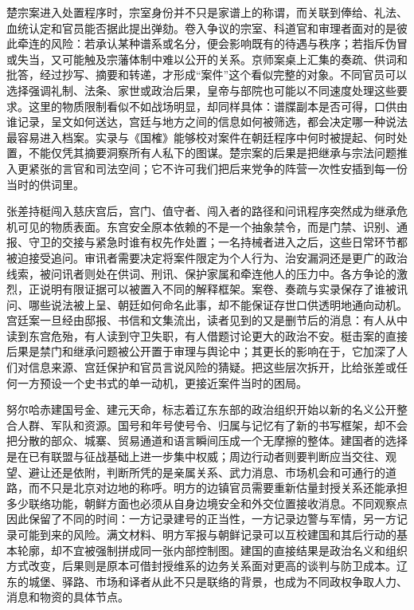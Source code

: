 楚宗案进入处置程序时，宗室身份并不只是家谱上的称谓，而关联到俸给、礼法、血统认定和官员能否据此提出弹劾。卷入争议的宗室、科道官和审理者面对的是彼此牵连的风险：若承认某种谱系或名分，便会影响既有的待遇与秩序；若指斥伪冒或失当，又可能触及宗藩体制中难以公开的关系。京师案桌上汇集的奏疏、供词和批答，经过抄写、摘要和转递，才形成“案件”这个看似完整的对象。不同官员可以选择强调礼制、法条、家世或政治后果，皇帝与部院也可能以不同速度处理这些要求。这里的物质限制看似不如战场明显，却同样具体：谱牒副本是否可得，口供由谁记录，呈文如何送达，宫廷与地方之间的信息如何被筛选，都会决定哪一种说法最容易进入档案。实录与《国榷》能够校对案件在朝廷程序中何时被提起、何时处置，不能仅凭其摘要洞察所有人私下的图谋。楚宗案的后果是把继承与宗法问题推入更紧张的言官和司法空间；它不许可我们把后来党争的阵营一次性安插到每一份当时的供词里。

张差持梃闯入慈庆宫后，宫门、值守者、闯入者的路径和问讯程序突然成为继承危机可见的物质表面。东宫安全原本依赖的不是一个抽象禁令，而是门禁、识别、通报、守卫的交接与紧急时谁有权先作处置；一名持械者进入之后，这些日常环节都被迫接受追问。审讯者需要决定将案件限定为个人行为、治安漏洞还是更广的政治线索，被问讯者则处在供词、刑讯、保护家属和牵连他人的压力中。各方争论的激烈，正说明有限证据可以被置入不同的解释框架。案卷、奏疏与实录保存了谁被讯问、哪些说法被上呈、朝廷如何命名此事，却不能保证存世口供透明地通向动机。宫廷案一旦经由邸报、书信和文集流出，读者见到的又是删节后的消息：有人从中读到东宫危殆，有人读到守卫失职，有人借题讨论更大的政治不安。梃击案的直接后果是禁门和继承问题被公开置于审理与舆论中；其更长的影响在于，它加深了人们对信息来源、宫廷保护和官员言说风险的猜疑。把这些层次拆开，比给张差或任何一方预设一个史书式的单一动机，更接近案件当时的困局。

努尔哈赤建国号金、建元天命，标志着辽东东部的政治组织开始以新的名义公开整合人群、军队和资源。国号和年号使号令、归属与记忆有了新的书写框架，却不会把分散的部众、城寨、贸易通道和语言瞬间压成一个无摩擦的整体。建国者的选择是在已有联盟与征战基础上进一步集中权威；周边行动者则要判断应当交往、观望、避让还是依附，判断所凭的是亲属关系、武力消息、市场机会和可通行的道路，而不只是北京对边地的称呼。明方的边镇官员需要重新估量封授关系还能承担多少联络功能，朝鲜方面也必须从自身边境安全和外交位置接收消息。不同观察点因此保留了不同的时间：一方记录建号的正当性，一方记录边警与军情，另一方记录可能到来的风险。满文材料、明方军报与朝鲜记录可以互校建国和其后行动的基本轮廓，却不宜被强制拼成同一张内部控制图。建国的直接结果是政治名义和组织方式改变，后果则是原本可借封授维系的边务关系面对更高的谈判与防卫成本。辽东的城堡、驿路、市场和译者从此不只是联络的背景，也成为不同政权争取人力、消息和物资的具体节点。

